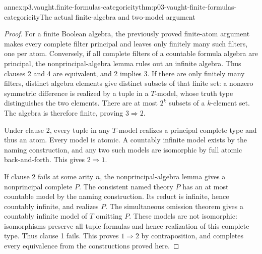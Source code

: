 \begin{annexitem}{annex:p3.vaught.finite-formulas-categoricity}{thm:p03-vaught-finite-formulas-categoricity}{The actual finite-algebra and two-model argument}
\begin{proof}
For a finite Boolean algebra, the previously proved finite-atom
argument makes every complete filter principal and leaves only
finitely many such filters, one per atom.
Conversely, if all complete filters of a countable formula algebra
are principal, the nonprincipal-algebra lemma rules out an infinite
algebra. Thus clauses 2 and 4 are equivalent, and 2 implies 3.
If there are only finitely many filters, distinct algebra elements
give distinct subsets of that finite set: a nonzero symmetric
difference is realized by a tuple in a \(T\)-model, whose truth
type distinguishes the two elements.
There are at most \(2^k\) subsets of a \(k\)-element set.
The algebra is therefore finite, proving \(3\Rightarrow2\).

Under clause 2, every tuple in any \(T\)-model realizes a principal
complete type and thus an atom. Every model is atomic.
A countably infinite model exists by the naming construction,
and any two such models are isomorphic by full atomic
back-and-forth. This gives \(2\Rightarrow1\).

If clause 2 fails at some arity \(n\), the nonprincipal-algebra
lemma gives a nonprincipal complete \(P\).
The consistent named theory \(\overline P\) has an at most countable
model by the naming construction. Its reduct is infinite, hence
countably infinite, and realizes \(P\).
The simultaneous omission theorem gives a countably infinite
model of \(T\) omitting \(P\).
These models are not isomorphic: isomorphisms preserve all tuple
formulas and hence realization of this complete type.
Thus clause 1 fails. This proves \(1\Rightarrow2\) by contraposition,
and completes every equivalence from the constructions proved here.
\end{proof}
\end{annexitem}
